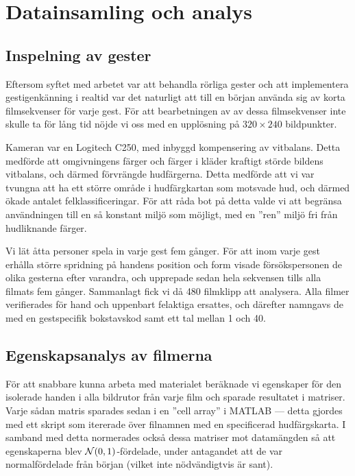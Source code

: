\documentclass[../rapport_MVEX01-11-05]{subfiles}
\begin{document}
\section{Datainsamling och analys}

\subsection{Inspelning av gester}
Eftersom syftet med arbetet var att behandla rörliga
gester och att implementera gestigenkänning i realtid var det naturligt att 
till en början använda sig av korta filmsekvenser för varje gest.
För att bearbetningen av av dessa filmsekvenser inte skulle ta för lång tid 
nöjde vi oss med en upplösning på $320\times240$ bildpunkter.

Kameran var en Logitech C250, med inbyggd kompensering av vitbalans. Detta
medförde att omgivningens färger och färger i kläder kraftigt störde bildens 
vitbalans, och därmed förvrängde hudfärgerna. Detta medförde att vi var
tvungna att ha ett större område i hudfärgkartan
som motsvade hud, och därmed ökade antalet felklassificeringar. För att råda
bot på detta valde vi att begränsa användningen till en så konstant miljö som
möjligt, med en ''ren'' miljö fri från hudliknande färger.

Vi lät åtta personer spela in varje gest fem gånger.
För att inom varje gest erhålla större spridning på handens position och form
visade försökspersonen de olika gesterna efter varandra, och upprepade sedan
hela sekvensen tills alla filmats fem gånger. Sammanlagt fick vi då 480
filmklipp att analysera.
Alla filmer verifierades för hand och uppenbart felaktiga ersattes, och därefter
namngavs de med en gestspecifik bokstavskod samt ett tal mellan 1 och 40.

\subsection{Egenskapsanalys av filmerna}
För att snabbare kunna arbeta med materialet beräknade vi
egenskaper för den isolerade handen i alla bildrutor från varje film och sparade
resultatet i matriser. Varje sådan matris sparades sedan i en ''cell array''
i MATLAB --- detta gjordes med ett skript som itererade över filnamnen
med en specificerad hudfärgskarta. I samband med detta normerades också dessa
matriser mot datamängden så att egenskaperna blev $\mathcal{N}(0,1)$-fördelade,
under antagandet att de var normalfördelade från början (vilket inte
nödvändigtvis är sant).
\end{document}

